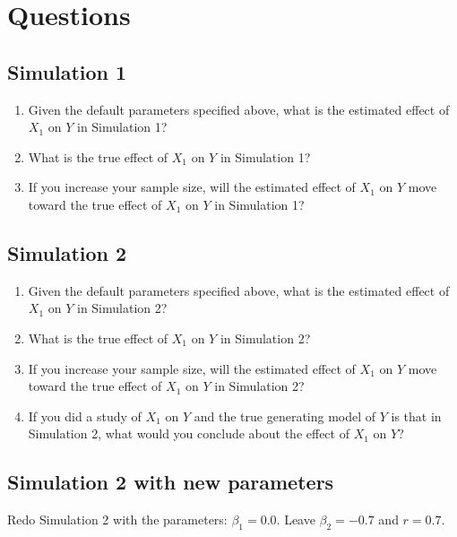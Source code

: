 \documentclass[]{book}
\providecommand{\tightlist}{%
  \setlength{\itemsep}{0pt}\setlength{\parskip}{0pt}}
\begin{document}
\section{Questions}\label{questions}

\subsection{Simulation 1}\label{simulation-1-1}

\begin{enumerate}
\def\labelenumi{\arabic{enumi}.}
\tightlist
\item
  Given the default parameters specified above, what is the estimated
  effect of \(X_1\) on \(Y\) in Simulation 1?
\item
  What is the true effect of \(X_1\) on \(Y\) in Simulation 1?
\item
  If you increase your sample size, will the estimated effect of \(X_1\)
  on \(Y\) move toward the true effect of \(X_1\) on \(Y\) in Simulation
  1?
\end{enumerate}

\subsection{Simulation 2}\label{simulation-2-1}

\begin{enumerate}
\def\labelenumi{\arabic{enumi}.}
\setcounter{enumi}{3}
\tightlist
\item
  Given the default parameters specified above, what is the estimated
  effect of \(X_1\) on \(Y\) in Simulation 2?
\item
  What is the true effect of \(X_1\) on \(Y\) in Simulation 2?
\item
  If you increase your sample size, will the estimated effect of \(X_1\)
  on \(Y\) move toward the true effect of \(X_1\) on \(Y\) in Simulation
  2?
\item
  If you did a study of \(X_1\) on \(Y\) and the true generating model
  of \(Y\) is that in Simulation 2, what would you conclude about the
  effect of \(X_1\) on \(Y\)?
\end{enumerate}

\subsection{Simulation 2 with new
parameters}\label{simulation-2-with-new-parameters}

Redo Simulation 2 with the parameters: \(\beta_1 = 0.0\). Leave
\(\beta_2 = -0.7\) and \(r=0.7\).
\end{document}
